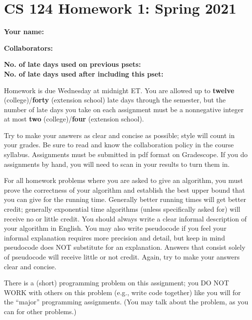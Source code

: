 \documentclass[11pt]{article}
\begin{document}
	
	\section*{CS 124 Homework 1: Spring 2021}
 		
	\textbf{Your name:} 
		
	\textbf{Collaborators:} 

	\textbf{No. of late days used on previous psets: }\\
	\textbf{No. of late days used after including this pset: }

Homework is due Wednesday at midnight ET. You are allowed up to {\bf twelve} (college)/{\bf forty} (extension school) late days through the semester, but the number of late days you take on each assignment must be a nonnegative integer at most {\bf two} (college)/{\bf four} (extension school).

Try to make your answers as clear and concise as possible;
style will count in your grades. Be sure to read and know the collaboration policy in the course
syllabus. Assignments must be submitted in pdf format on Gradescope. If you do assignments by hand, you
will need to scan in your results to turn them in. 

For all homework problems where you are asked to give an algorithm, you must prove the correctness
of your algorithm and establish the best upper bound that you can give for the running time. Generally
better running times will get better credit; generally exponential time algorithms (unless specifically asked
for) will receive no or little credit. You should always write a clear informal description of your algorithm
in English. You may also write pseudocode if you feel your informal explanation requires more precision
and detail, but keep in mind pseudocode does NOT substitute for an explanation. Answers that consist
solely of pseudocode will receive little or not credit. Again, try to make your answers clear and concise.

There is a (short) programming problem on this assignment; you DO NOT WORK with others on
this problem (e.g., write code together) like you will for the ``major'' programming assignments. (You may
talk about the problem, as you can for other problems.)
\end{document}
